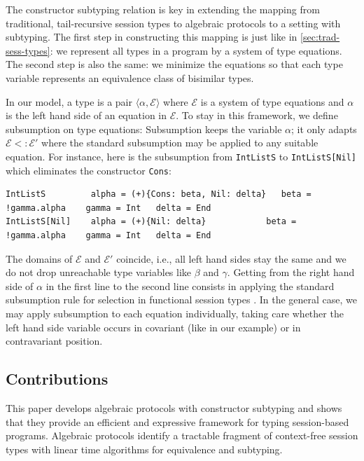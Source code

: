 The constructor subtyping relation is key in extending the mapping from traditional,
tail-recursive session types to algebraic protocols to a setting with
subtyping. The first step in constructing this mapping is just like in
\cref{sec:trad-sess-types}: we represent all types in a program by a system of type
equations. The second step is also the same: we minimize the
equations so that each type variable represents an equivalence class
of bisimilar types.

In our model, 
a type is a pair $\langle\alpha, \mathcal{E}\rangle$ where
$\mathcal{E}$ is a system of type equations and $\alpha$ is the left
hand side of an equation in $\mathcal{E}$. To stay in this framework,
we define subsumption on type equations: Subsumption keeps the
variable $\alpha$; it only adapts $\mathcal{E} <: \mathcal{E}'$ where
the standard subsumption may be applied to any suitable equation. For instance,
here is the subsumption from \lstinline{IntListS} to
\lstinline{IntListS[Nil]} which eliminates the constructor
\lstinline{Cons}: 
\begin{lstlisting}
IntListS         alpha = (+){Cons: beta, Nil: delta}   beta = !gamma.alpha    gamma = Int   delta = End  
IntListS[Nil]    alpha = (+){Nil: delta}            beta = !gamma.alpha    gamma = Int   delta = End
\end{lstlisting}
The domains of $\mathcal{E}$ and $\mathcal{E}'$ coincide, i.e., all
left hand sides stay the same and we do not drop 
unreachable type variables like $\beta$ and $\gamma$. Getting from the
right hand side of $\alpha$ in the first line to the second line
consists in applying the standard subsumption rule for selection in
functional session types \cite{DBLP:journals/jfp/GayV10}. In the
general case, we may apply subsumption to each equation individually,
taking care whether the left hand side variable occurs in covariant
(like in our example) or in contravariant position.

\subsection*{Contributions}

This paper develops algebraic protocols with constructor
subtyping and shows that they provide an efficient and expressive
framework for typing session-based programs.
Algebraic protocols identify a tractable fragment of context-free
session types with linear time algorithms for equivalence and subtyping.


